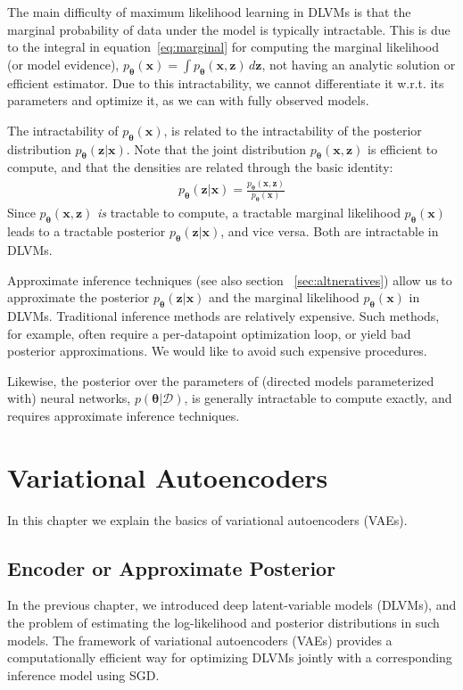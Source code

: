\documentclass[MAL,biber]{nowfnt} %
\newcommand{\bb}[1]{\mathbf{#1}}
\newcommand{\bx}{\bb{x}}
\newcommand{\bz}{\bb{z}}
\newcommand{\bT}{\boldsymbol{\theta}}
\newcommand{\pT}{p_{\bT}}
\begin{document}
The main difficulty of maximum likelihood learning in DLVMs is that the marginal probability of data under the model is typically intractable. This is due to the integral in equation~\eqref{eq:marginal} for computing the marginal likelihood (or model evidence), $\pT(\bx) = \int \pT(\bx,\bz) \,d\bz$, not having an analytic solution or efficient estimator. Due to this intractability, we cannot differentiate it w.r.t. its parameters and optimize it, as we can with fully observed models.

The intractability of $\pT(\bx)$, is related to the intractability of the posterior distribution $\pT(\bz|\bx)$. Note that the joint distribution $\pT(\bx,\bz)$ is efficient to compute, and that the densities are related through the basic identity:
\begin{align}
\pT(\bz|\bx) = \frac{\pT(\bx,\bz)}{\pT(\bx)}
\end{align}
Since $\pT(\bx,\bz)$ \emph{is} tractable to compute, a tractable marginal likelihood $\pT(\bx)$ leads to a tractable posterior $\pT(\bz|\bx)$, and vice versa. Both are intractable in DLVMs.

Approximate inference techniques (see also section ~\ref{sec:altneratives}) allow us to approximate the posterior $\pT(\bz|\bx)$ and the marginal likelihood $\pT(\bx)$ in DLVMs. Traditional inference methods are relatively expensive. Such methods, for example, often require a per-datapoint optimization loop, or yield bad posterior approximations. We would like to avoid such expensive procedures. 

Likewise, the posterior over the parameters of (directed models parameterized with) neural networks, $p(\bT|\mathcal{D})$, is generally intractable to compute exactly, and requires approximate inference techniques.

\chapter{Variational Autoencoders}
\label{chap:vaes}

In this chapter we explain the basics of variational autoencoders (VAEs).



\section{Encoder or Approximate Posterior}
\label{sec:encoder}

In the previous chapter, we introduced deep latent-variable models (DLVMs), and the problem of estimating the log-likelihood and posterior distributions in such models. The framework of variational autoencoders (VAEs) provides a computationally efficient way for optimizing DLVMs jointly with a corresponding inference model using SGD.
\end{document}
